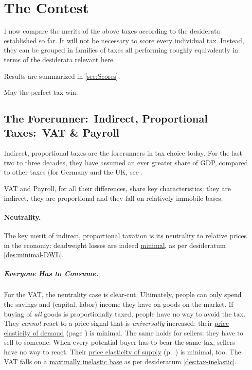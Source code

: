 \section{The Contest}
	\label{sec:contest}
I now compare the merits of the above taxes according to the desiderata established so far.
It will not be necessary to score every individual tax.
Instead, they can be grouped in families of taxes all performing roughly equivalently in terms of the desiderata relevant here.

Results are summarized in \autoref{sec:Scores}.

May the perfect tax win.

\subsection[Indirect, Proportional Taxes]{The Forerunner:\ Indirect, Proportional Taxes:\ VAT \& Payroll}
	\label{sec:ScoreVAT}
Indirect, proportional taxes are the forerunners in tax choice today.
For the last two to three decades, they have assumed an ever greater share of GDP, compared to other taxes (for Germany and the UK, see \citep[11]{Kemmerling2009}.

VAT and Payroll, for all their differences, share key characteristics:
they are indirect, they are proportional and they fall on relatively immobile bases.

\paragraph{Neutrality.}
The key merit of indirect, proportional taxation is its neutrality to relative prices in the economy:
deadweight losses are indeed \hyperref[des:minimal-DWL]{minimal}, as per desideratum \ref{des:minimal-DWL}.

\subparagraph{Everyone Has to Consume.}
For the VAT, the neutrality case is clear-cut.
Ultimately, people can only spend the savings and (capital, labor) income they have on goods on the market.
If buying of \emph{all} goods is proportionally taxed, people have no way to avoid the tax.
They \emph{cannot} react to a price signal that is \emph{universally} increased:
their \hyperref[eq:PED]{price elasticity of demand} (page \pageref{eq:PED}) is minimal.
The same holds for sellers:
they have to sell to someone.
When every potential buyer has to bear the same tax, sellers have no way to react.
Their \hyperref[eq:PES]{price elasticity of supply} (p.~\pageref{eq:PES}) is minimal, too.
The VAT falls on a \hyperref[des:tax-inelastic]{maximally inelastic base} as per desideratum \ref{des:tax-inelastic}.

